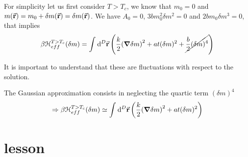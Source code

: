 \documentclass[../main/main.tex]{subfiles}
\begin{document}
For simplicity let us first consider \( T>T_c \),  we know that \( m_0 = 0 \) and
\( m (\va{r}) = m_0 + \delta m(\va{r}) = \delta m (\va{r}) \). We have \( A_0 =0 \), \( 3bm_0^2 \delta m^2 = 0 \) and \( 2 b m_0 \delta m^3 = 0 \), that implies
\begin{equation}
  \beta \mathcal{H}_{eff}^{T>T_c} (\delta m)= \int_{}^{} \dd[D]{\va{r}} \qty(\frac{k}{2} \qty(\grad \delta m)^2 + a t (\delta m)^2 + \cancel{\frac{b}{2} (\delta m)^4} )
\end{equation}
\begin{remark}
It is important to understand that these are fluctuations with respect to the solution.
\end{remark}
The Gaussian approximation consists in neglecting the quartic term \( (\delta m)^4 \)
\begin{equation}
  \Rightarrow
    \beta \mathcal{H}_{eff}^{T>T_c} (\delta m) \simeq  \int_{}^{} \dd[D]{\va{r}} \qty(\frac{k}{2} \qty(\grad \delta m)^2 + a t (\delta m)^2 )
\end{equation}

\section{lesson}
\end{document}
